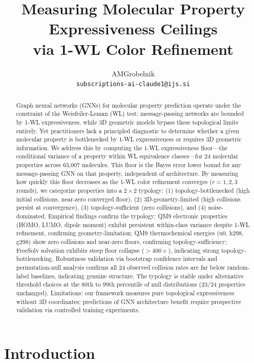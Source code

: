 \documentclass[11pt,letterpaper]{article}
\title{\textbf{Measuring Molecular Property Expressiveness Ceilings\\via 1-WL Color Refinement}}
\author{
  AMGrobelnik\\
  \small\texttt{subscriptions-ai-claude1@ijs.si}
}
\date{}
\begin{document}
\maketitle

\begin{abstract}
Graph neural networks (GNNs) for molecular property prediction operate under the constraint of the Weisfeiler-Leman (WL) test: message-passing networks are bounded by 1-WL expressiveness, while 3D geometric models bypass these topological limits entirely. Yet practitioners lack a principled diagnostic to determine whether a given molecular property is bottlenecked by 1-WL expressiveness or requires 3D geometric information. We address this by computing the 1-WL expressiveness floor---the conditional variance of a property within WL equivalence classes---for 24 molecular properties across 63,007 molecules. This floor is the Bayes error lower bound for any message-passing GNN on that property, independent of architecture. By measuring how quickly this floor decreases as the 1-WL color refinement converges ($r=1, 2, 3$ rounds), we categorize properties into a $2\times2$ typology: (1) topology-bottlenecked (high initial collisions, near-zero converged floor), (2) 3D-geometry-limited (high collisions persist at convergence), (3) topology-sufficient (zero collisions), and (4) noise-dominated. Empirical findings confirm the typology: QM9 electronic properties (HOMO, LUMO, dipole moment) exhibit persistent within-class variance despite 1-WL refinement, confirming geometry-limitation; QM9 thermochemical energies (u0, h298, g298) show zero collisions and near-zero floors, confirming topology-sufficiency; FreeSolv solvation exhibits steep floor collapse ($>400\times$), indicating strong topology-bottlenecking. Robustness validation via bootstrap confidence intervals and permutation-null analysis confirms all 24 observed collision rates are far below random-label baselines, indicating genuine structure. The typology is stable under alternative threshold choices at the 80th to 99th percentile of null distributions (23/24 properties unchanged). Limitations: our framework measures pure topological expressiveness without 3D coordinates; predictions of GNN architecture benefit require prospective validation via controlled training experiments.
\end{abstract}

\section{Introduction}
\end{document}
